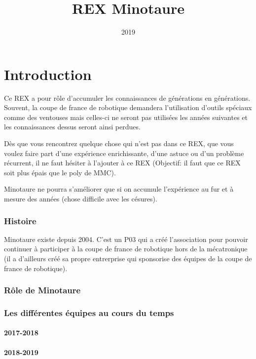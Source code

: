 \documentclass[a4paper, 11pt]{report}
\title{REX Minotaure}
\date{2019}
\begin{document}
\maketitle

\tableofcontents

\part{Introduction}

Ce REX a pour rôle d'accumuler les connaissances de générations en générations. Souvent, la coupe de france de robotique demandera l'utilisation d'outils spéciaux comme des ventouses mais celles-ci ne seront pas utilisées les années suivantes et les connaissances dessus seront ainsi perdues.

Dès que vous rencontrez quelque chose qui n'est pas dans ce REX, que vous voulez faire part d'une expérience enrichissante, d'une astuce ou d'un problème récurrent, il ne faut hésiter à l'ajouter à ce REX (Objectif: il faut que ce REX soit plus épais que le poly de MMC).

Minotaure ne pourra s'améliorer que si on accumule l'expérience au fur et à mesure des années (chose difficile avec les césures).

\section{Histoire}
Minotaure existe depuis 2004. C'est un P03 qui a créé l'association pour pouvoir continuer à participer à la coupe de france de robotique hors de la mécatronique (il a d'ailleurs créé sa propre entrerprise qui sponsorise des équipes de la coupe de france de robotique).

\section{Rôle de Minotaure}

\section{Les différentes équipes au cours du temps}

\subsection{2017-2018}

\subsection{2018-2019}
\end{document}
